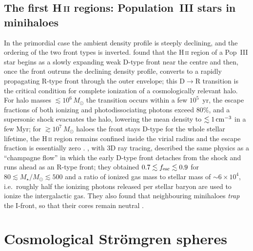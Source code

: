 \documentclass[11pt,a4paper]{article}
\newcommand{\ion}[2]{\textrm{#1\,\textsc{#2}}}
\begin{document}
\subsection{The first \ion{H}{ii} regions: Population~III stars in minihaloes}
In the primordial case the ambient density profile is steeply declining, and the ordering of the two
front types is inverted. \citet{Kitayama2004} found that the \ion{H}{ii} region of a Pop~III star
begins as a slowly expanding weak D-type front near the centre and then, once the front outruns the
declining density profile, converts to a rapidly propagating R-type front through the outer envelope;
this D$\to$R transition is the critical condition for complete ionization of a cosmologically
relevant halo. For halo masses $\lesssim10^6\,M_\odot$ the transition occurs within a few
$10^5$~yr, the escape fractions of both ionizing and photodissociating photons exceed $80\%$, and a
supersonic shock evacuates the halo, lowering the mean density to $\lesssim1\,{\rm cm^{-3}}$ in a few
Myr; for $\gtrsim10^7\,M_\odot$ haloes the front stays D-type for the whole stellar lifetime, the
\ion{H}{ii} region remains confined inside the virial radius and the escape fraction is essentially
zero \citep{Kitayama2004}. \citet{Alvarez2006}, with 3D ray tracing, described the same physics as a
``champagne flow'' in which the early D-type front detaches from the shock and runs ahead as an
R-type front; they obtained $0.7\lesssim f_{\rm esc}\lesssim0.9$ for $80\lesssim M_\star/M_\odot
\lesssim500$ and a ratio of ionized gas mass to stellar mass of $\sim6\times10^4$, i.e.\ roughly half
the ionizing photons released per stellar baryon are used to ionize the intergalactic gas. They also
found that neighbouring minihaloes \emph{trap} the I-front, so that their cores remain neutral
\citep{Alvarez2006}.

\section{Cosmological Str\"omgren spheres}
\label{sec:cosmo}
\end{document}
